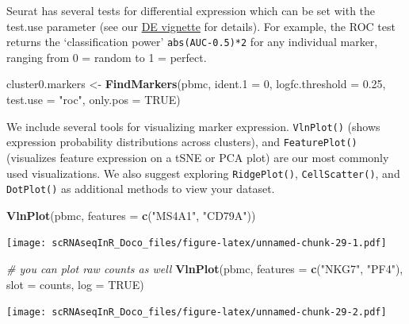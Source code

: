 \documentclass[
]{book}
\newenvironment{Shaded}{\begin{snugshade}}{\end{snugshade}}
\newcommand{\AttributeTok}[1]{\textcolor[rgb]{0.13,0.29,0.53}{#1}}
\newcommand{\CommentTok}[1]{\textcolor[rgb]{0.56,0.35,0.01}{\textit{#1}}}
\newcommand{\ConstantTok}[1]{\textcolor[rgb]{0.56,0.35,0.01}{#1}}
\newcommand{\DecValTok}[1]{\textcolor[rgb]{0.00,0.00,0.81}{#1}}
\newcommand{\FloatTok}[1]{\textcolor[rgb]{0.00,0.00,0.81}{#1}}
\newcommand{\FunctionTok}[1]{\textcolor[rgb]{0.13,0.29,0.53}{\textbf{#1}}}
\newcommand{\NormalTok}[1]{#1}
\newcommand{\OtherTok}[1]{\textcolor[rgb]{0.56,0.35,0.01}{#1}}
\newcommand{\StringTok}[1]{\textcolor[rgb]{0.31,0.60,0.02}{#1}}
\begin{document}
Seurat has several tests for differential expression which can be set with the test.use parameter (see our \href{de_vignette.html}{DE vignette} for details). For example, the ROC test returns the `classification power' \texttt{abs(AUC-0.5)*2} for any individual marker, ranging from 0 = random to 1 = perfect.

\begin{Shaded}
\begin{Highlighting}[]
\NormalTok{cluster0.markers }\OtherTok{\textless{}{-}} \FunctionTok{FindMarkers}\NormalTok{(pbmc, }\AttributeTok{ident.1 =} \DecValTok{0}\NormalTok{, }\AttributeTok{logfc.threshold =} \FloatTok{0.25}\NormalTok{, }\AttributeTok{test.use =} \StringTok{"roc"}\NormalTok{, }\AttributeTok{only.pos =} \ConstantTok{TRUE}\NormalTok{)}
\end{Highlighting}
\end{Shaded}

We include several tools for visualizing marker expression. \texttt{VlnPlot()} (shows expression probability distributions across clusters), and \texttt{FeaturePlot()} (visualizes feature expression on a tSNE or PCA plot) are our most commonly used visualizations. We also suggest exploring \texttt{RidgePlot()}, \texttt{CellScatter()}, and \texttt{DotPlot()} as additional methods to view your dataset.

\begin{Shaded}
\begin{Highlighting}[]
\FunctionTok{VlnPlot}\NormalTok{(pbmc, }\AttributeTok{features =} \FunctionTok{c}\NormalTok{(}\StringTok{"MS4A1"}\NormalTok{, }\StringTok{"CD79A"}\NormalTok{))}
\end{Highlighting}
\end{Shaded}

\texttt{[image: scRNAseqInR\_Doco\_files/figure-latex/unnamed-chunk-29-1.pdf]}

\begin{Shaded}
\begin{Highlighting}[]
\CommentTok{\# you can plot raw counts as well}
\FunctionTok{VlnPlot}\NormalTok{(pbmc, }\AttributeTok{features =} \FunctionTok{c}\NormalTok{(}\StringTok{"NKG7"}\NormalTok{, }\StringTok{"PF4"}\NormalTok{), }\AttributeTok{slot =} \StringTok{\textquotesingle{}counts\textquotesingle{}}\NormalTok{, }\AttributeTok{log =} \ConstantTok{TRUE}\NormalTok{)}
\end{Highlighting}
\end{Shaded}

\texttt{[image: scRNAseqInR\_Doco\_files/figure-latex/unnamed-chunk-29-2.pdf]}
\end{document}
